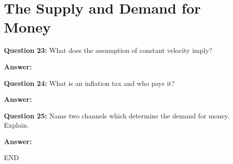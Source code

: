 \documentclass[a4paper, 11pt]{article}
\begin{document}
\section{The Supply and Demand for Money}

\textbf{Question 23:} What does the assumption of constant velocity imply?

\textbf{Answer:} 


\textbf{Question 24:} What is an inflation tax and who pays it?

\textbf{Answer:} 


\textbf{Question 25:} Name two channels which determine the demand for money. Explain.

\textbf{Answer:} 



\centering
END
\end{document}

